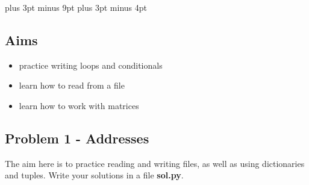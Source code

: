 \documentclass[11pt,a4paper]{report}
\begin{document}
\belowdisplayskip=12pt plus 3pt minus 9pt
\belowdisplayshortskip=7pt plus 3pt minus 4pt

\subsection*{Aims}
\begin{itemize}
 \item practice writing loops and conditionals
 \item learn how to read from a file
 \item learn how to work with matrices
\end{itemize}

\subsection*{Problem 1 - Addresses}

The aim here is to practice reading and writing files, as well as using dictionaries and tuples. Write your solutions in a file \textbf{sol.py}.
\end{document}

